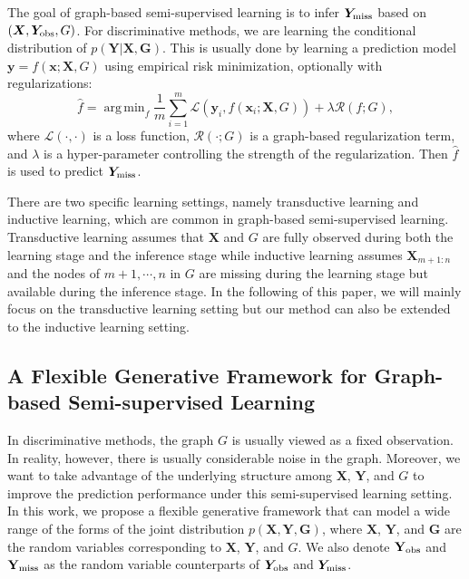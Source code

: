 \documentclass{article}
\def\rmG{{\mathbf{G}}}
\def\rmX{{\mathbf{X}}}
\def\rmY{{\mathbf{Y}}}
\def\vx{{\bm{x}}}
\def\vy{{\bm{y}}}
\def\mX{{\bm{X}}}
\def\mY{{\bm{Y}}}
\def\gL{{\mathcal{L}}}
\def\gR{{\mathcal{R}}}
\DeclareMathOperator*{\argmin}{arg\,min}
\newcommand{\Ymiss}{\mY_{\rm{miss}}}
\newcommand{\Yobs}{\mY_{\rm{obs}}}
\newcommand{\rYmiss}{\rmY_{\rm{miss}}}
\newcommand{\rYobs}{\rmY_{\rm{obs}}}
\begin{document}
The goal of graph-based semi-supervised learning is to infer $\Ymiss$ based on $(\mX, \Yobs, G)$. For discriminative methods, we are learning the conditional distribution of $p(\rmY|\rmX, \rmG)$. This is usually done by learning a prediction model $\vy = f(\vx; \mX, G)$ using empirical risk minimization, optionally with regularizations:
$$\hat{f} = \argmin_{f} \frac{1}{m}\sum_{i=1}^m \gL(\vy_i, f(\vx_i; \mX, G)) + \lambda \gR(f; G),$$
where $\gL(\cdot, \cdot)$ is a loss function, $\gR(\cdot; G)$ is a graph-based regularization term, and $\lambda$ is a hyper-parameter controlling the strength of the regularization. Then $\hat{f}$ is used to predict $\Ymiss$.

There are two specific learning settings, namely transductive learning and inductive learning, which are common in graph-based semi-supervised learning. Transductive learning assumes that $\mX$ and $G$ are fully observed during both the learning stage and the inference stage while inductive learning assumes $\mX_{m+1:n}$ and the nodes of $m+1, \cdots, n$ in $G$ are missing during the learning stage but available during the inference stage. In the following of this paper, we will mainly focus on the transductive learning setting but our method can also be extended to the inductive learning setting.

\subsection{A Flexible Generative Framework for Graph-based Semi-supervised Learning}

In discriminative methods, the graph $G$ is usually viewed as a fixed observation. In reality, however, there is usually considerable noise in the graph. Moreover, we want to take advantage of the underlying structure among $\mX$, $\mY$, and $G$ to improve the prediction performance under this semi-supervised learning setting. In this work, we propose a flexible generative framework that can model a wide range of the forms of the joint distribution $p(\rmX, \rmY, \rmG)$, where $\rmX$, $\rmY$, and $\rmG$ are the random variables corresponding to $\mX$, $\mY$, and $G$. We also denote $\rYobs$ and $\rYmiss$ as the random variable counterparts of $\Yobs$ and $\Ymiss$. 
\end{document}
